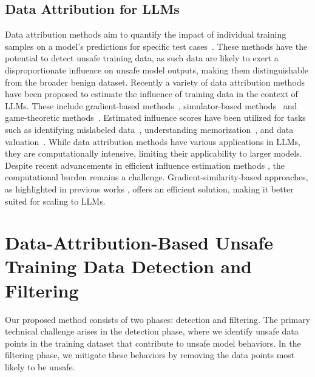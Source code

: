 \documentclass[11pt]{article}
\begin{document}
\subsection{Data Attribution for LLMs}

Data attribution methods aim to quantify the impact of individual training samples on a model's predictions for specific test cases~\citep{koh2020understandingblackboxpredictionsinfluence}. These methods have the potential to detect unsafe training data, as such data are likely to exert a disproportionate influence on unsafe model outputs, making them distinguishable from the broader benign dataset. Recently a variety of data attribution methods have been proposed to estimate the influence of training data in the context of LLMs. These include gradient-based methods~\citep{xia2024lessselectinginfluentialdata,kwon2024datainfefficientlyestimatingdata}, simulator-based methods~\citep{guu2023simfluencemodelinginfluenceindividual,chai2024trainingdatainfluencegpt} and game-theoretic methods~\citep{wang2024datashapleytrainingrun,wang2024helpfulharmfuldatafinetuningfree}.
Estimated influence scores have been utilized for tasks such as identifying mislabeled data~\citep{pruthi2020estimatingtrainingdatainfluence}, understanding memorization~\citep{feldman2020neuralnetworksmemorizewhy}, and data valuation~\citep{choe2024dataworthgptllmscale}. 
While data attribution methods have various applications in LLMs, they are computationally intensive, limiting their applicability to larger models. Despite recent advancements in efficient influence estimation methods \cite{kwon2024datainfefficientlyestimatingdata}, the computational burden remains a challenge. Gradient-similarity-based approaches, as highlighted in previous works \cite{xia2024lessselectinginfluentialdata,pruthi2020estimatingtrainingdatainfluence}, offers an efficient solution, making it better suited for scaling to LLMs.

\section{Data-Attribution-Based Unsafe Training Data Detection and Filtering}

Our proposed method consists of two phases: detection and filtering. The primary technical challenge arises in the detection phase, where we identify unsafe data points in the training dataset that contribute to unsafe model behaviors. In the filtering phase, we mitigate these behaviors by removing the data points most likely to be unsafe.
\end{document}
